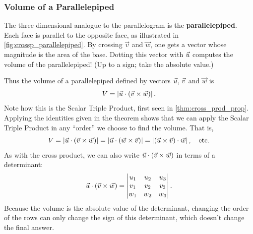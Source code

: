 \subsubsection{Volume of a Parallelepiped}


The three dimensional analogue to the parallelogram is the \textbf{parallelepiped}.
Each face is parallel to the opposite face, as illustrated in \autoref{fig:crossp_parallelepiped}. By crossing $\vec v$ and $\vec w$, one gets a vector whose magnitude is the area of the base. Dotting this vector with $\vec u$ computes the volume of the parallelepiped! (Up to a sign; take the absolute value.)

%
%
%
%

Thus the volume of a parallelepiped defined by vectors $\vec u$, $\vec v$ and $\vec w$ is
\begin{equation}
V = \left\lvert \vec u\cdot (\vec v\times\vec w) \right\rvert.\label{eq:crossp2}
\end{equation}
Note how this is the Scalar Triple Product, first seen in \autoref{thm:cross_prod_prop}. Applying the identities given in the theorem shows that we can apply the Scalar Triple Product in any ``order'' we choose to find the volume. That is,
\[V = \left\lvert \vec u\cdot(\vec v\times\vec w) \right\rvert = \left\lvert \vec u\cdot (\vec w\times\vec v) \right\rvert = \left\lvert (\vec u\times\vec v)\cdot \vec w \right\rvert,\quad \text{etc.}\]
As with the cross product, we can also write $\vec u\cdot(\vec v\times\vec w)$ in terms of a determinant:
\[
 \vec u\cdot(\vec v\times\vec w)=
 \begin{vmatrix}u_1&u_2&u_3\\v_1&v_2&v_3\\w_1&w_2&w_3\end{vmatrix}.
\]
Because the volume is the absolute value of the determinant, changing the order of the rows can only change the sign of this determinant, which doesn't change the final answer.



